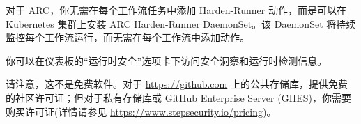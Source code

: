 对于 ARC，你无需在每个工作流任务中添加 Harden-Runner 动作，而是可以在 Kubernetes 集群上安装 ARC Harden-Runner DaemonSet。该 DaemonSet 将持续监控每个工作流运行，而无需在每个工作流中添加动作。

你可以在仪表板的“运行时安全”选项卡下访问安全洞察和运行时检测信息。

请注意，这不是免费软件。对于 \url{https://github.com} 上的公共存储库，提供免费的社区许可证；但对于私有存储库或 GitHub Enterprise Server (GHES)，你需要购买许可证(详情请参见 \url{https://www.stepsecurity.io/pricing})。




